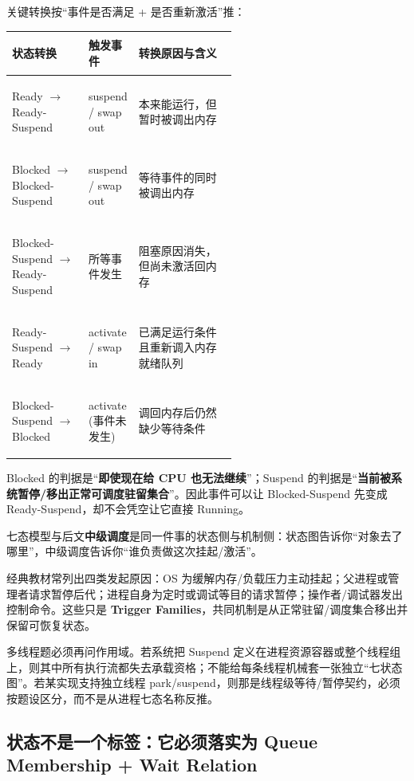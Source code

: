 \documentclass[11pt,a4paper]{ctexart}
\newcommand{\kw}[1]{\textbf{#1}}
\begin{document}
关键转换按“事件是否满足 + 是否重新激活”推：

\begingroup
\small
\renewcommand{\arraystretch}{1.25}
\setlength{\tabcolsep}{4pt}
\begin{tabularx}{\linewidth}{>{\bfseries\raggedright}p{0.34\linewidth} >{\raggedright}p{0.22\linewidth} >{\raggedright\arraybackslash}X}
\toprule
状态转换 & 触发事件 & 转换原因与含义\\
\midrule
Ready $\rightarrow$ Ready-Suspend & suspend / swap out & 本来能运行，但暂时被调出内存\\
Blocked $\rightarrow$ Blocked-Suspend & suspend / swap out & 等待事件的同时被调出内存\\
Blocked-Suspend $\rightarrow$ Ready-Suspend & 所等事件发生 & 阻塞原因消失，但尚未激活回内存\\
Ready-Suspend $\rightarrow$ Ready & activate / swap in & 已满足运行条件且重新调入内存就绪队列\\
Blocked-Suspend $\rightarrow$ Blocked & activate (事件未发生) & 调回内存后仍然缺少等待条件\\
\bottomrule
\end{tabularx}
\endgroup

\begin{exam}
Blocked 的判据是“\kw{即使现在给 CPU 也无法继续}”；Suspend 的判据是“\kw{当前被系统暂停/移出正常可调度驻留集合}”。因此事件可以让 Blocked-Suspend 先变成 Ready-Suspend，却不会凭空让它直接 Running。
\end{exam}

七态模型与后文\kw{中级调度}是同一件事的状态侧与机制侧：状态图告诉你“对象去了哪里”，中级调度告诉你“谁负责做这次挂起/激活”。

\begin{exam}
经典教材常列出四类发起原因：OS 为缓解内存/负载压力主动挂起；父进程或管理者请求暂停后代；进程自身为定时或调试等目的请求暂停；操作者/调试器发出控制命令。这些只是 \kw{Trigger Families}，共同机制是从正常驻留/调度集合移出并保留可恢复状态。

多线程题必须再问作用域。若系统把 Suspend 定义在进程资源容器或整个线程组上，则其中所有执行流都失去承载资格；不能给每条线程机械套一张独立“七状态图”。若某实现支持独立线程 park/suspend，则那是线程级等待/暂停契约，必须按题设区分，而不是从进程七态名称反推。
\end{exam}

\subsection{状态不是一个标签：它必须落实为 Queue Membership + Wait Relation}
\end{document}
